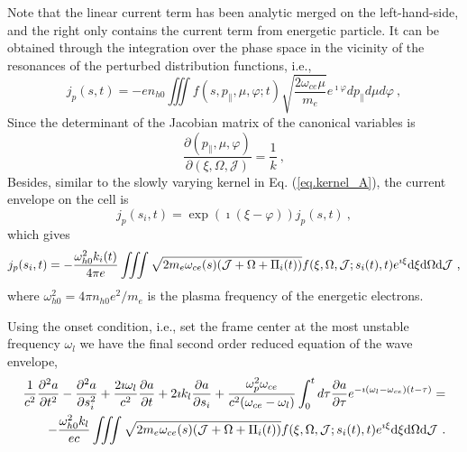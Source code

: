 Note that the linear current term has been analytic merged on the left-hand-side, and the right only contains the current term from energetic particle. It can be obtained through the integration over the phase space in the vicinity of the resonances of the perturbed distribution functions, i.e.,
\begin{equation}
    j_p(s, t)=-e n_{h 0} \iiint f\left(s, p_{\parallel}, \mu, \varphi ; t\right) \sqrt{\frac{2 \omega_{ce} \mu}{m_{e}}} e^{\imath \varphi} d p_{\parallel} d \mu d \varphi~,
\end{equation}
Since the determinant of the Jacobian matrix of the canonical variables is 
\begin{equation}
    \frac{\partial (p_\|,\mu,\varphi)}{\partial (\xi,\Omega,\mathcal{J})} = \frac{1}{k}~,
\end{equation}
Besides, similar to the slowly varying kernel in Eq. (\ref{eq.kernel_A}), the current envelope on the cell is
\begin{equation}
j_{p}(s_i,t) = \exp(\imath(\xi-\varphi))j_{p}(s,t)~,
\end{equation}
which gives
\begin{equation}\label{eq.nonlinear_J}
    j_p(s_i,t) = - \frac{\omega_{h0}^2k_i(t)}{4\pi e}\iiint \sqrt{2m_e\omega_{ce}(s)(\mathcal{J}+\Omega+\Pi_i(t))}f(\xi,\Omega,\mathcal{J};s_i(t),t)e^{\imath \xi} \rm d \xi \rm d \Omega \rm d \mathcal{J}~,
\end{equation}
where $\omega^2_{h0} = 4 \pi n_{h0} e^2 /m_e$ is the plasma frequency of the energetic electrons.

Using the onset condition, i.e., set the frame center at the most unstable frequency $\omega_l$ we have the final second order reduced equation of the wave envelope, 
\begin{equation}
    \begin{aligned}
    \frac{1}{c^2}\frac{\partial^2 a}{\partial t^2} - \frac{\partial^2 a}{\partial s_i^2} + \frac{2\imath\omega_l}{c^2}\frac{\partial a}{\partial t} + 2\imath k_l\frac{\partial a}{\partial s_i} + \frac{\omega_p^2 \omega_{c e}}{c^2(\omega_{c e}-\omega_l)} \int_0^t d \tau \frac{\partial a}{\partial \tau} e^{-\imath\left(\omega_l-\omega_{c e}\right)(t-\tau)} = 
    \\
    - \frac{\omega_{h0}^2k_l}{ec}\iiint \sqrt{2m_e\omega_{ce}(s)(\mathcal{J}+\Omega+\Pi_i(t))}f(\xi,\Omega,\mathcal{J};s_i(t),t)e^{\imath \xi} \rm d \xi \rm d \Omega \rm d \mathcal{J}~.    
\end{aligned}
  \end{equation}

